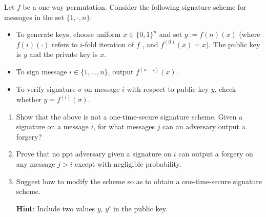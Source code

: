 \documentclass[a4paper,10pt,landscape,twocolumn]{scrartcl}
\begin{document}
\begin{exercise}
	
Let $f$ be a one-way permutation. Consider the following signature
scheme for messages in the set $\{1,\cdot , n\}$:
\begin{itemize}
\item To generate keys, choose uniform $x \in \{0, 1\}^n$ and set $y := f (n) (x)$
(where $f (i) (·)$ refers to $i$-fold iteration of $f$ , and $f^{(0)} (x) = x$). The
public key is $y$ and the private key is $x$.
\item To sign message $i \in \{1,\dots , n\}$, output $f^{(n−i)} (x)$.
\item To verify signature $\sigma$ on message $i$ with respect to public key $y$,
check whether $y = f^{(i)} (\sigma)$.
\end{itemize}

\begin{enumerate}
\item Show that the above is not a one-time-secure signature scheme.
Given a signature on a message $i$, for what messages $j$ can an
adversary output a forgery?
\item Prove that no ppt adversary given a signature on $i$ can output a
forgery on any message $j > i$ except with negligible probability.
\item Suggest how to modify the scheme so as to obtain a one-time-secure
signature scheme.

\textbf{Hint}: Include two values $y$, $y'$ in the public key.	
\end{enumerate}

	
\end{exercise}
\end{document}
